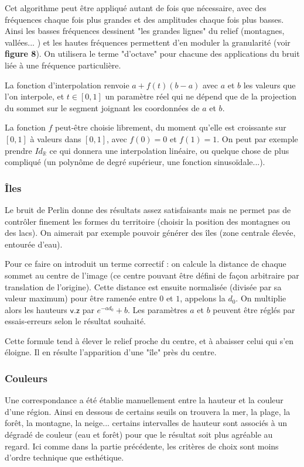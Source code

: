 \documentclass[a4paper, 10pt]{article}
\begin{document}
Cet algorithme peut être appliqué autant de fois que nécessaire, avec des fréquences chaque fois plus grandes et des amplitudes chaque fois plus basses. Ainsi les basses fréquences dessinent "les grandes lignes" du relief (montagnes, vallées... ) et les hautes fréquences permettent d'en moduler la granularité (voir \textbf{figure 8}). On utilisera le terme "d'octave" pour chacune des applications du bruit liée à une fréquence particulière.  
  
La fonction d'interpolation renvoie $a+f(t)(b-a)$ avec $a$ et $b$ les valeurs que l'on interpole, et $t \in [0,1]$ un paramètre réel qui ne dépend que de la projection du sommet sur le segment joignant les coordonnées de $a$ et $b$.  
  
La fonction $f$ peut-être choisie librement, du moment qu'elle est croissante sur $[0,1]$ à valeurs dans $[0,1]$, avec $f(0)=0$ et $f(1)=1$. On peut par exemple prendre $Id_{\mathbb{R}}$ ce qui donnera une interpolation linéaire, ou quelque chose de plus compliqué (un polynôme de degré supérieur, une fonction sinusoïdale...).
\subsubsection{Îles}  
Le bruit de Perlin donne des résultats assez satisfaisants mais ne permet pas de contrôler finement les formes du territoire (choisir la position des montagnes ou des lacs). On aimerait par exemple pouvoir générer des îles (zone centrale élevée, entourée d'eau).   
  
Pour ce faire on introduit un terme correctif : on calcule la distance de chaque sommet au centre de l'image (ce centre pouvant être défini de façon arbitraire par translation de l'origine). Cette distance est ensuite normalisée (divisée par sa valeur maximum) pour être ramenée entre $0$ et $1$, appelons la $d_0$. On multiplie alors les hauteurs $\mathsf{v.z}$ par $e^{-ad_0}+b$. Les paramètres $a$ et $b$ peuvent être réglés par essais-erreurs selon le résultat souhaité.  
  
Cette formule tend à élever le relief proche du centre, et à abaisser celui qui s'en éloigne. Il en résulte l'apparition d'une "île" près du centre.    
\subsubsection{Couleurs}  
Une correspondance a été établie manuellement entre la hauteur et la couleur d'une région. Ainsi en dessous de certains seuils on trouvera la mer, la plage, la forêt, la montagne, la neige... certains intervalles de hauteur sont associés à un dégradé de couleur (eau et forêt) pour que le résultat soit plus agréable au regard. Ici comme dans la partie précédente, les critères de choix sont moins d'ordre technique que esthétique.  
\end{document}
